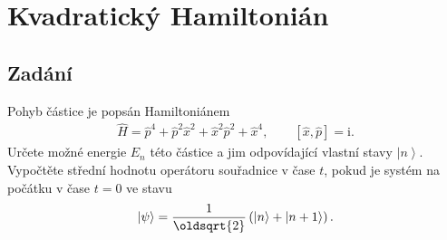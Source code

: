 \documentclass[10pt,a4paper]{article}
\newcommand{\comm}[2]{\left[ #1, #2 \right]}
\newcommand{\const}[1]{\text{#1}}
\newcommand{\ket}[1]{\left| #1 \right>}
\renewcommand{\i}{\const{i}}
\begin{document}
\section{Kvadratický Hamiltonián}
\subsection{Zadání}
Pohyb částice je popsán Hamiltoniánem
\begin{align*}
    \hat{H}
    = \hat{p}^4
    + \hat{p}^2 \hat{x}^2
    + \hat{x}^2 \hat{p}^2
    + \hat{x}^4,
    \hspace{2em}
    \comm{\hat{x}}{\hat{p}} = \i.
\end{align*}
Určete možné energie $E_n$ této částice a jim odpovídající vlastní stavy $\ket{n}$. Vypočtěte střední hodnotu operátoru souřadnice v čase $t$, pokud je systém na počátku v čase $t=0$ ve stavu
\begin{align*}
    \ket{\psi} =
    \frac{1}{\oldsqrt{2}}
    \left( \ket{n} + \ket{n+1} \right).
\end{align*}
\end{document}
